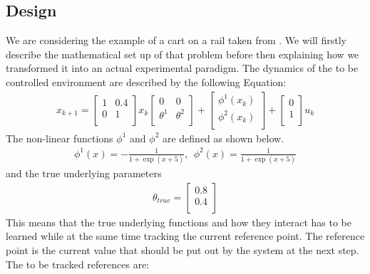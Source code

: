 \documentclass[10pt,letterpaper]{article}
\begin{document}
\subsection{Design}
We are considering the example of a cart on a rail taken from \citep{klenske2015dual}. We will firstly describe the mathematical set up of that problem before then explaining how we transformed it into an actual experimental paradigm. The dynamics of the to be controlled environment are described by the following Equation:
\begin{align*}
x_{k+1}=\begin{bmatrix}
1 & 0.4\\
0 & 1\\
\end{bmatrix}
x_k
\begin{bmatrix}
0 & 0\\
\theta^1 & \theta^2\\
\end{bmatrix}
+
\begin{bmatrix}
\phi^1(x_k)\\
\phi^2(x_k)\\
\end{bmatrix}
+
\begin{bmatrix}
0\\
1\\
\end{bmatrix}
u_k
\end{align*}
The non-linear functions $\phi^1$ and $\phi^2$ are defined as shown below.
\begin{align*}
\phi^1(x)=-\frac{1}{1+\exp(x+5)},~~\phi^2(x)=\frac{1}{1+\exp(x+5)}
\end{align*}
 and the true underlying parameters
\begin{align*}
\theta_{true}=\begin{bmatrix}
0.8\\
0.4\\
\end{bmatrix}
\end{align*}
This means that the true underlying functions and how they interact has to be learned while at the same time tracking the current reference point. The reference point is the current value that should be put out by the system at the next step. The to be tracked references are:
\end{document}
